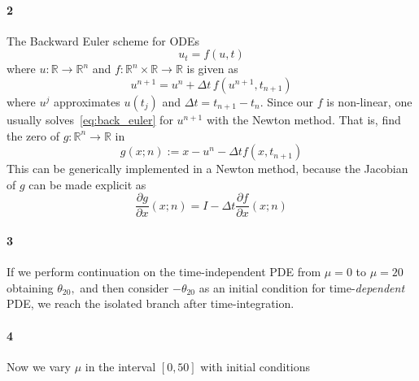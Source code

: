 \documentclass[a4paper]{article}
\begin{document}
  \paragraph{2} The Backward Euler scheme for ODEs
  \begin{equation}
    u_t = f(u, t)
  \end{equation}
  where $u: \mathbb{R} \to \mathbb{R}^n$ and $f: \mathbb{R}^n \times \mathbb{R} \to \mathbb{R}$ is given as
  \begin{equation}\label{eq:back_euler}
    u^{n+1} = u^{n} + \Delta t \, f(u^{n+1}, t_{n+1})
  \end{equation}
  where $u^j$ approximates $u(t_j)$ and $\Delta t = t_{n+1} - t_n.$ Since our $f$ is non-linear, one usually solves~\eqref{eq:back_euler} for $u^{n+1}$ with the Newton method. That is, find the zero of $g: \mathbb{R}^n \to \mathbb{R}$ in
  \begin{equation}
    g(x; n) := x - u^n - \Delta t f(x, t_{n + 1})
  \end{equation}
  This can be generically implemented in a Newton method, because the Jacobian of $g$ can be made explicit as
  \begin{equation}
    \frac{\partial g}{\partial x}(x; n) = I - \Delta t \frac{\partial f}{\partial x}(x; n)
  \end{equation}

  \paragraph{3} If we perform continuation on the time-independent PDE from $\mu = 0$ to $\mu = 20$ obtaining $\theta_{20},$ and then consider $-\theta_{20}$ as an initial condition for time-\emph{dependent} PDE, we reach the isolated branch after time-integration.

  \paragraph{4} Now we vary $\mu$ in the interval $[0, 50]$ with initial conditions 
\end{document}
